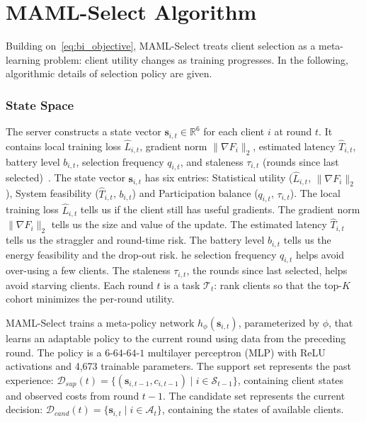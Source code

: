 \documentclass[journal]{IEEEtran}
\newcommand{\revision}[1]{#1}
\begin{document}
\section{MAML-Select Algorithm}
\revision{Building on~\eqref{eq:bi_objective}, MAML-Select treats client selection as a meta-learning problem: client utility changes as training progresses. In the following, algorithmic details of selection policy are given.}

\subsubsection{State Space}
\revision{The server constructs a state vector $\bm{s}_{i,t} \in \mathbb{R}^6$ for each client $i$ at round $t$. It contains local training loss $\hat{L}_{i,t}$, gradient norm $\|\nabla F_i\|_2$, estimated latency $\hat{T}_{i,t}$, battery level $b_{i,t}$, selection frequency $q_{i,t}$, and staleness $\tau_{i,t}$ (rounds since last selected)}~\cite{pan2024contextual,xu2024federated}. The state vector $\bm{s}_{i,t}$ has six entries: Statistical utility ($\hat{L}_{i,t}$, $\lVert\nabla F_{i}\rVert_{2}$), System feasibility ($\hat{T}_{i,t}$, $b_{i,t}$) and Participation balance ($q_{i,t}$, $\tau_{i,t}$). The local training loss $\hat{L}_{i,t}$ tells us if the client still has useful gradients. The gradient norm $\lVert\nabla F_{i}\rVert_{2}$ tells us the size and value of the update. The estimated latency $\hat{T}_{i,t}$ tells us the straggler and round-time risk. The battery level $b_{i,t}$ tells us the energy feasibility and the drop-out risk. he selection frequency $q_{i,t}$ helps avoid over-using a few clients. The staleness $\tau_{i,t}$, the rounds since last selected, helps avoid starving clients.
Each round $t$ is a task $\mathcal{T}_t$: rank clients so that the top-$K$ cohort minimizes the per-round utility.%

MAML-Select trains a meta-policy network $h_\phi(\bm{s}_{i,t})$, parameterized by $\phi$, that learns an adaptable policy to the current round using data from the preceding round. \revision{The policy is a $6$-$64$-$64$-$1$ multilayer perceptron (MLP) with ReLU activations and 4,673 trainable parameters.} The support set represents the past experience: $\mathcal{D}_{sup}(t) = \{(\bm{s}_{i,t-1}, c_{i,t-1}) \mid i \in \revision{\mathcal{S}_{t-1}}\}$, containing client states and observed costs from round $t-1$. \revision{The candidate set represents the current decision: $\mathcal{D}_{cand}(t) = \{\bm{s}_{i,t} \mid i \in \mathcal{A}_t\}$, containing the states of available clients.}
\end{document}
